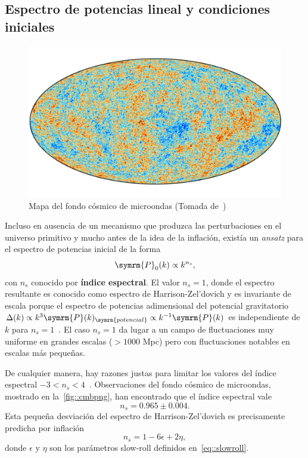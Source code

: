 \subsection{Espectro de potencias lineal y condiciones iniciales}
\begin{figure}[t]
    \centering
    \includegraphics[scale=.7]{img/Cmb_inpaint_T_smica_v1-min.png}
    \caption[Mapa del fondo cósmico de microondas]{Mapa del fondo cósmico de microondas (Tomada de~\cite{collaboration2020planck4})}
    \label{fig::cmbpng}
\end{figure}
Incluso en ausencia de un mecanismo que produzca las perturbaciones en el universo primitivo y mucho antes de la idea de la inflación, existía un \textit{ansatz} para el espectro de potencias inicial de la forma~\cite{harrison1970,zel1970hypothesis,peebles1970primeval}
\begin{equation}
    \symrm{P}_0(k)\propto k^{n_s},\label{eq::espectroprim}
\end{equation}
con \(n_s\) conocido por \textbf{índice espectral}. El valor \(n_s=1\), donde el espectro resultante es conocido como espectro de Harrison-Zel'dovich y es invariante de escala porque el espectro de potencias adimensional del potencial gravitatorio \(\Delta(k)\propto k^3\symrm{P}(k)_{\symrm{potencial}}\propto k^{-1}\symrm{P}(k)\) es independiente de \(k\) para \(n_s=1\)~\cite{baumann2022cosmology}. El caso \(n_s=1\) da lugar a un campo de fluctuaciones muy uniforme en grandes escalas (\(>1000\) Mpc) pero con fluctuaciones notables en escalas más pequeñas.

De cualquier manera, hay razones justas para limitar los valores del índice espectral \(-3<n_s<4\)~\cite{peacock1998cosmological}. Observaciones del fondo cósmico de microondas, mostrado en la~\autoref{fig::cmbpng}, han encontrado que el índice espectral vale~\cite{collaboration2020planck}
\begin{equation}
    n_s=0.965\pm 0.004.\label{eq::theoryns}
\end{equation}
Esta pequeña desviación del espectro de Harrison-Zel'dovich es precisamente predicha por inflación
\begin{equation}
    n_s=1-6\epsilon+2\eta,
\end{equation}
donde \(\epsilon\) y \(\eta\) son los parámetros slow-roll definidos en~\eqref{eq::slowroll}.

